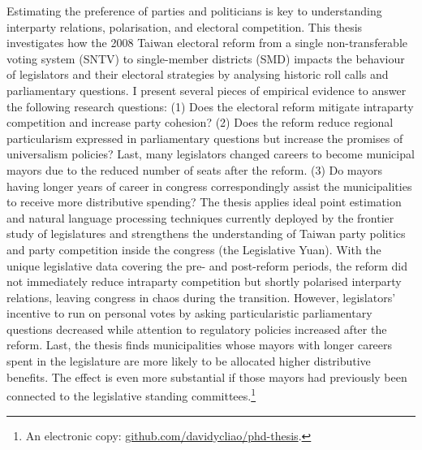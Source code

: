 \small Estimating the preference of parties and politicians is key to understanding interparty relations, polarisation, and electoral competition. This thesis investigates how the 2008 Taiwan electoral reform from a single non-transferable voting system (SNTV) to single-member districts (SMD) impacts the behaviour of legislators and their electoral strategies by analysing historic roll calls and parliamentary questions. I present several pieces of empirical evidence to answer the following research questions: (1) Does the electoral reform mitigate intraparty competition and increase party cohesion? (2) Does the reform reduce regional particularism expressed in parliamentary questions but increase the promises of universalism policies? Last, many legislators changed careers to become municipal mayors due to the reduced number of seats after the reform. (3) Do mayors having longer years of career in congress correspondingly assist the municipalities to receive more distributive spending? The thesis applies ideal point estimation and natural language processing techniques currently deployed by the frontier study of legislatures and strengthens the understanding of Taiwan party politics and party competition inside the congress (the Legislative Yuan). With the unique legislative data covering the pre- and post-reform periods, the reform did not immediately reduce intraparty competition but shortly polarised interparty relations, leaving congress in chaos during the transition. However, legislators' incentive to run on personal votes by asking particularistic parliamentary questions decreased while attention to regulatory policies increased after the reform. Last, the thesis finds municipalities whose mayors with longer careers spent in the legislature are more likely to be allocated higher distributive benefits. The effect is even more substantial if those mayors had previously been connected to the legislative standing committees.\footnote{An electronic copy: \href{ https://github.com/davidycliao/phd-thesis}{github.com/davidycliao/phd-thesis}.}